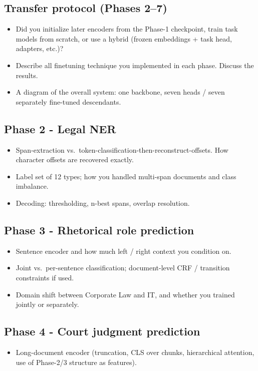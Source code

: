 \documentclass[11pt, oneside]{article}
\begin{document}
\subsection{Transfer protocol (Phases 2--7)}
\begin{itemize}[leftmargin=*]
    \item Did you initialize later encoders from the Phase-1 checkpoint, train task models from scratch, or use a hybrid (frozen embeddings + task head, adapters, etc.)?
    \item Describe all finetuning technique you implemented in each phase. Discuss the results.
    \item A diagram of the overall system: one backbone, seven heads / seven separately fine-tuned descendants.
\end{itemize}
\subsection{Phase 2 - Legal NER}
\begin{itemize}[leftmargin=*]
    \item Span-extraction vs.\ token-classification-then-reconstruct-offsets. How character offsets are recovered exactly.
    \item Label set of 12 types; how you handled multi-span documents and class imbalance.
    \item Decoding: thresholding, n-best spans, overlap resolution.
\end{itemize}
\subsection{Phase 3 - Rhetorical role prediction}
\begin{itemize}[leftmargin=*]
    \item Sentence encoder and how much left / right context you condition on.
    \item Joint vs.\ per-sentence classification; document-level CRF / transition constraints if used.
    \item Domain shift between Corporate Law and IT, and whether you trained jointly or separately.
\end{itemize}
\subsection{Phase 4 - Court judgment prediction}
\begin{itemize}[leftmargin=*]
    \item Long-document encoder (truncation, CLS over chunks, hierarchical attention, use of Phase-2/3 structure as features).
\end{itemize}
\end{document}
